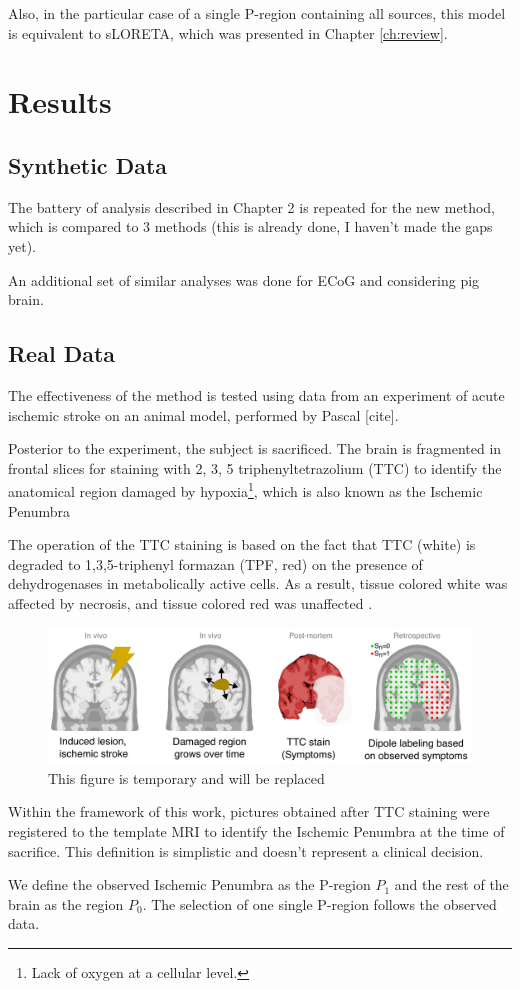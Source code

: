 Also, in the particular case of a single P-region containing all sources, this model is equivalent to sLORETA, which was presented in Chapter \ref{ch:review}.



\section{Results}

\subsection{Synthetic Data}

The battery of analysis described in Chapter 2 is repeated for the new method, which is compared to 3 methods (this is already done, I haven't made the gaps yet).

An additional set of similar analyses was done for ECoG and considering pig brain.

\subsection{Real Data}

The effectiveness of the method is tested using data from an experiment 
of acute ischemic stroke on an animal model, performed by
Pascal [cite].

Posterior to the experiment, the subject is sacrificed.
%
The brain is fragmented in frontal slices for staining with
2, 3, 5 
triphenyltetrazolium (TTC)
to identify the anatomical region damaged by hypoxia\footnote{Lack of oxygen at a cellular level.}, which is also known as the Ischemic Penumbra

The operation of the TTC staining is based on the fact that TTC (white) 
is degraded to 1,3,5-triphenyl formazan (TPF, red)
on the presence of dehydrogenases in metabolically active cells.
%
As a result, tissue colored white was affected by necrosis, and tissue colored red was unaffected \cite{li2018use}. 

\begin{figure}
\centering
\includegraphics[width=\linewidth]{./img_dev/motivation.pdf}
\caption{This figure is temporary and will be replaced}
\end{figure}

Within the framework of this work, pictures obtained after TTC staining were registered to the template MRI to identify the Ischemic Penumbra at the time of sacrifice.
%
This definition is simplistic and doesn't represent a clinical decision.

We define the observed Ischemic Penumbra as the P-region $P_1$ and the rest of the brain as the region $P_0$.
%
The selection of one single P-region follows the observed data.
